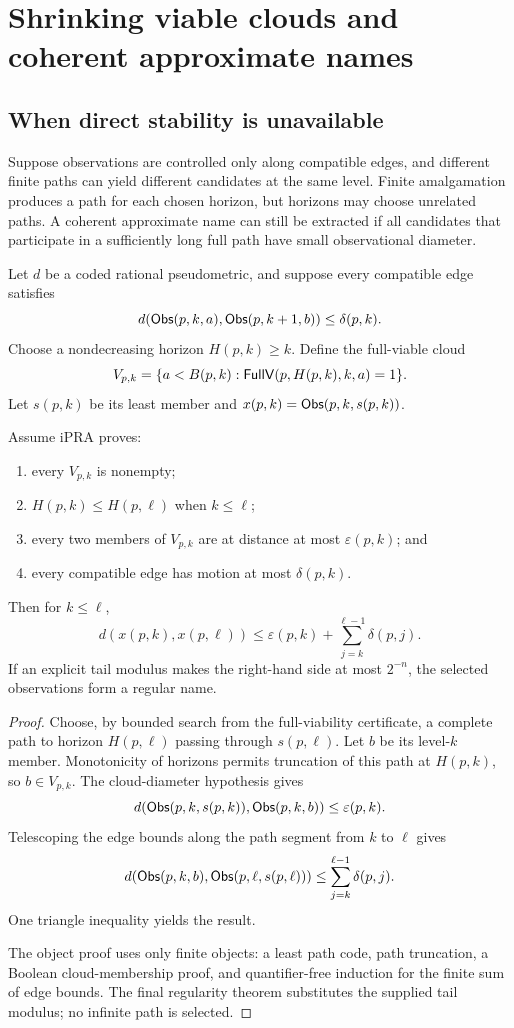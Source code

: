 \section{Shrinking viable clouds and coherent approximate names}
\label{sec:shrinking}

\subsection{When direct stability is unavailable}

Suppose observations are controlled only along compatible edges, and different
finite paths can yield different candidates at the same level.  Finite
amalgamation produces a path for each chosen horizon, but horizons may choose
unrelated paths.  A coherent approximate name can still be extracted if all
candidates that participate in a sufficiently long full path have small
observational diameter.

Let \(d\) be a coded rational pseudometric, and suppose every compatible edge
satisfies
\[
 d(\mathsf{Obs}(p,k,a),\mathsf{Obs}(p,k+1,b))\le\delta(p,k).
\]
Choose a nondecreasing horizon \(H(p,k)\ge k\).  Define the full-viable cloud
\[
 V_{p,k}=\{a<B(p,k):\mathsf{FullV}(p,H(p,k),k,a)=1\}.
\]
Let \(s(p,k)\) be its least member and
\(x(p,k)=\mathsf{Obs}(p,k,s(p,k))\).

\begin{theorem}
\label{thm:shrinking}
Assume iPRA proves:
\begin{enumerate}[label=(SV\arabic*)]
\item every \(V_{p,k}\) is nonempty;
\item \(H(p,k)\le H(p,\ell)\) when \(k\le\ell\);
\item every two members of \(V_{p,k}\) are at distance at most
      \(\varepsilon(p,k)\); and
\item every compatible edge has motion at most \(\delta(p,k)\).
\end{enumerate}
Then for \(k\le\ell\),
\[
 d(x(p,k),x(p,\ell))
 \le \varepsilon(p,k)+
      \sum_{j=k}^{\ell-1}\delta(p,j).
\]
If an explicit tail modulus makes the right-hand side at most \(2^{-n}\), the
selected observations form a regular name.
\end{theorem}

\begin{proof}
Choose, by bounded search from the full-viability certificate, a complete path
to horizon \(H(p,\ell)\) passing through \(s(p,\ell)\).  Let \(b\) be its
level-\(k\) member.  Monotonicity of horizons permits truncation of this path at
\(H(p,k)\), so \(b\in V_{p,k}\).  The cloud-diameter hypothesis gives
\[
 d(\mathsf{Obs}(p,k,s(p,k)),\mathsf{Obs}(p,k,b))\le\varepsilon(p,k).
\]
Telescoping the edge bounds along the path segment from \(k\) to \(\ell\)
gives
\[
 d(\mathsf{Obs}(p,k,b),\mathsf{Obs}(p,\ell,s(p,\ell)))
 \le\sum_{j=k}^{\ell-1}\delta(p,j).
\]
One triangle inequality yields the result.

The object proof uses only finite objects: a least path code, path truncation,
a Boolean cloud-membership proof, and quantifier-free induction for the finite
sum of edge bounds.  The final regularity theorem substitutes the supplied tail
modulus; no infinite path is selected.
\end{proof}


